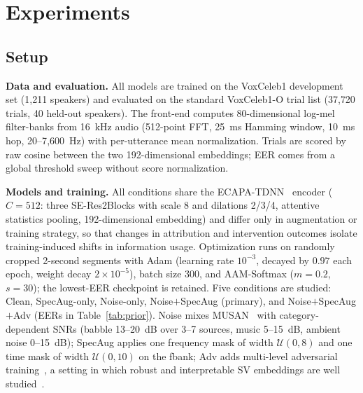 \documentclass{article}
\begin{document}
\section{Experiments}
\label{sec:exp}

\subsection{Setup}

\textbf{Data and evaluation.} All models are trained on the VoxCeleb1 development set (1{,}211 speakers) and evaluated on the standard VoxCeleb1-O trial list (37{,}720 trials, 40 held-out speakers). The front-end computes 80-dimensional log-mel filter-banks from 16~kHz audio (512-point FFT, 25~ms Hamming window, 10~ms hop, 20--7{,}600~Hz) with per-utterance mean normalization. Trials are scored by raw cosine between the two 192-dimensional embeddings; EER comes from a global threshold sweep without score normalization.

\textbf{Models and training.} All conditions share the ECAPA-TDNN~\cite{ECAPATDNNEmphasizedChannel2020a} encoder ($C{=}512$: three SE-Res2Blocks with scale 8 and dilations 2/3/4, attentive statistics pooling, 192-dimensional embedding) and differ only in augmentation or training strategy, so that changes in attribution and intervention outcomes isolate training-induced shifts in information usage. Optimization runs on randomly cropped 2-second segments with Adam (learning rate $10^{-3}$, decayed by $0.97$ each epoch, weight decay $2{\times}10^{-5}$), batch size 300, and AAM-Softmax ($m{=}0.2$, $s{=}30$); the lowest-EER checkpoint is retained. Five conditions are studied: Clean, SpecAug-only, Noise-only, Noise$+$SpecAug (primary), and Noise$+$SpecAug$+$Adv (EERs in Table~\ref{tab:prior}). Noise mixes MUSAN~\cite{snyder2015musan} with category-dependent SNRs (babble 13--20~dB over 3--7 sources, music 5--15~dB, ambient noise 0--15~dB); SpecAug applies one frequency mask of width $\mathcal{U}(0,8)$ and one time mask of width $\mathcal{U}(0,10)$ on the fbank; Adv adds multi-level adversarial training~\cite{zhang2025multilevel}, a setting in which robust and interpretable SV embeddings are well studied~\cite{he2024multiview,fang2024improving,zhang2023visualization}.
\end{document}
